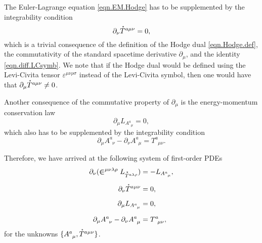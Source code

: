 \documentclass[
10pt, %
a4paper, %
oneside, %
headinclude,footinclude, %
BCOR5mm, %
]{scrartcl}
\newcommand{\IP}[1]{{\color{Red}[IP:\ \ #1]}}
\newcommand{\pd}[1]{\partial_{#1}}
\newcommand{\tetr}[2]{A^{#1}_{\phantom{#1}#2}}
\newcommand{\D}[1]{\partial_{#1}} %
\newcommand{\Tors}[2]{T^{#1}_{\phantom{a}#2}}
\newcommand{\Laghodge}{L}%
\newcommand{\LCsymb}{\bm{\in}}    %
\newcommand{\LCtens}{\varepsilon} %
\newcommand{\HDT}[1]{\accentset{\star}{T}^{#1}}
\begin{document}
The Euler-Lagrange equation \eqref{eqn.EM.Hodge} has to be supplemented by the integrability 
condition
\begin{equation}\label{integr.HT}
\D{\nu}\HDT{a\mu\nu} = 0,
\end{equation}
which is a trivial consequence of the definition of the  Hodge dual \eqref{eqn.Hodge.def}, the 
commutativity of the standard spacetime derivative $ \D{\mu} $, and the 
identity \eqref{eqn.diff.LCsymb}.
We note that if the Hodge dual would be defined using the Levi-Civita tensor $ 
\LCtens^{\mu\nu\rho\sigma} $ instead of the Levi-Civita symbol, then one would 
have that $ \D{\mu}\HDT{a\mu\nu} \neq 0 $.

Another consequence of the commutative property of $ \pd{\mu} $ is the energy-momentum
conservation law
\begin{equation}\label{eqn.EM}
\D{\mu}\Laghodge_{\tetr{a}{\mu}} = 0,
\end{equation}
which also has to be supplemented by the integrability condition 
\begin{equation}\label{eqn.tetr}
\D{\mu}\tetr{a}{\nu} - \D{\nu}\tetr{a}{\mu} = \Tors{a}{\mu\nu}.
\end{equation}

Therefore, we have arrived at the following system of first-order PDEs 
\begin{subequations}\label{eqn.1st.order.TEGR0}
	\begin{align}	
	\D{\nu}(\LCsymb^{\mu\nu\lambda\rho}\Laghodge_{\HDT{a\lambda\rho}}) 
	&=-\Laghodge_{\tetr{a}{\mu}},\label{eqn.TEGR0.EL}\\[2mm]
	\D{\nu}\HDT{a\mu\nu} & = 0,\label{eqn.TEGR0.integr}\\[2mm]
	\D{\mu}\Laghodge_{\tetr{a}{\mu}} & = 0,\label{eqn.TEGR0.enermomen}\\[2mm]
	\D{\mu}\tetr{a}{\nu} - \D{\nu}\tetr{a}{\mu} &= \Tors{a}{\mu\nu},\label{eqn.TEGR0.tetrad}
	\end{align}
\end{subequations}
for the unknowns $ \{\tetr{a}{\mu},\HDT{a\mu\nu}\} $.
\end{document}
